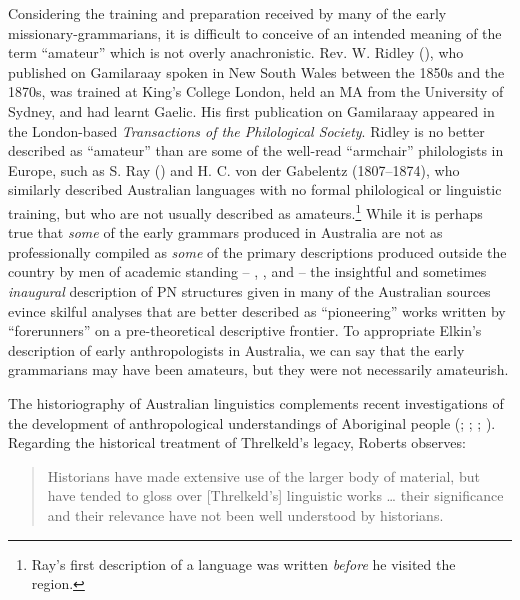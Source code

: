 Considering the training and preparation received by many of the early mis\-sion\-ary-grammarians, it is difficult to conceive of an intended meaning of the term “amateur” which is not overly anachronistic. Rev. W. Ridley (), who published on Gamilaraay spoken in New South Wales between the 1850s and the 1870s, was trained at King's College London, held an MA from the University of Sydney, and had learnt Gaelic. His first publication on Gamilaraay appeared in the London-based \textit{Transactions of the Philological Society}. Ridley is no better described as “amateur” than are some of the well-read “armchair” philologists in Europe, such as S. Ray () and H. C. von der Gabelentz (1807--1874), who similarly described Australian languages with no formal philological or linguistic training, but who are not usually described as amateurs.\footnote{Ray’s first description of a language \citep{ray_study_1893} was written \textit{before} he visited the region.} While it is perhaps true that \textit{some} of the early grammars produced in Australia are not as professionally compiled as \textit{some} of the primary descriptions produced outside the country by men of academic standing – \citet{hale_languages_1846}, \citet{ray_study_1893}, and \citet{ray_linguistics_1907} – the insightful and sometimes \textit{inaugural} description of PN structures given in many of the Australian sources evince skilful analyses that are better described as “pioneering” works written by “forerunners” on a pre-theoretical descriptive frontier. To appropriate Elkin’s \citeyearpar[1]{elkin_r_1975} description of early anthropologists in Australia, we can say that the early grammarians may have been amateurs, but they were not necessarily amateurish.

The historiography of Australian linguistics complements recent investigations of the development of anthropological understandings of Aboriginal people (\citealt{weit_2004}; \citealt{kenny_arandas_2013}; \citealt{gardner_southern_2015}; \citealt{kelly_mcconvell_2018}). Regarding the historical treatment of Threlkeld’s legacy, Roberts observes: 

\begin{quote}
    Historians have made extensive use of the larger body of material, but have tended to gloss over [Threlkeld’s] linguistic works … their significance and their relevance have not been well understood by historians. \citep[108]{roberts_language_2008}
\end{quote}

